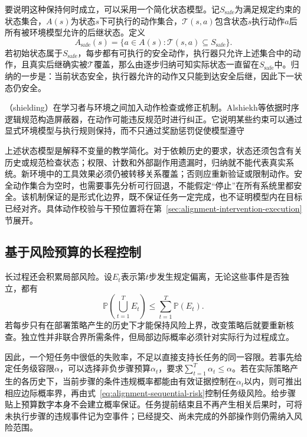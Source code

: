 要说明这种保持何时成立，可以采用一个简化状态模型。记$S_{\mathrm{safe}}$为满足规定约束的状态集合，$A(s)$为状态$s$下可执行的动作集合，$\mathcal T(s,a)$包含状态$s$执行动作$a$后所有被环境模型允许的后继状态。定义
\begin{equation}
 A_{\mathrm{safe}}(s)
 =\{a\in A(s):\mathcal T(s,a)\subseteq S_{\mathrm{safe}}\}.
 \label{eq:alignment-safe-actions}
\end{equation}
若初始状态属于$S_{\mathrm{safe}}$，每步都有可执行的安全动作，执行器只允许上述集合中的动作，且真实后继确实被$\mathcal T$覆盖，那么由逐步归纳可知实际状态一直留在$S_{\mathrm{safe}}$中。归纳的一步是：当前状态安全，执行器允许的动作又只能到达安全后继，因此下一状态仍安全。

（shielding）在学习者与环境之间加入动作检查或修正机制。Alshiekh等依据时序逻辑规范构造屏蔽器，在动作可能违反规范时进行纠正。它说明某些约束可以通过显式环境模型与执行规则保持，而不只通过奖励惩罚促使模型遵守

上述状态模型是解释不变量的教学简化。对于依赖历史的要求，状态还须包含有关历史或规范检查状态；权限、计数和外部副作用遗漏时，归纳就不能代表真实系统。新环境中的工具效果必须仍被转移关系覆盖；否则应重新验证或限制动作。安全动作集合为空时，也需要事先分析可行回退，不能假定“停止”在所有系统里都安全。该机制保证的是形式化边界，既不保证任务一定完成，也不证明模型内在目标已经对齐。具体动作校验与干预位置将在第~\ref{sec:alignment-intervention-execution}节展开。

\subsection{基于风险预算的长程控制}
\label{sec:alignment-generalization-horizon}

长过程还会积累局部风险。设$E_t$表示第$t$步发生规定偏离，无论这些事件是否独立，都有
\begin{equation}
 \mathbb P\left(\bigcup_{t=1}^{T}E_t\right)
 \leq\sum_{t=1}^{T}\mathbb P(E_t).
 \label{eq:alignment-sequential-risk}
\end{equation}
若每步只有在部署策略产生的历史下才能保持风险上界，改变策略后就要重新核查。独立性并非联合界所需条件，但局部边际概率必须针对实际行为过程成立。

因此，一个短任务中很低的失败率，不足以直接支持长任务的同一容限。若事先给定任务级容限$\alpha$，可以选择非负步骤预算$\alpha_t$，要求$\sum_{t=1}^{T}\alpha_t\leq\alpha$。若在实际策略产生的各历史下，当前步骤的条件违规概率都能由有效证据控制在$\alpha_t$以内，则可推出相应边际概率界，再由式~\eqref{eq:alignment-sequential-risk}控制任务级风险。给步骤贴上预算数字本身不会建立概率保证。任务提前结束且不再产生相关后果时，可将未执行步骤的违规事件记为空事件；已经提交、尚未完成的外部操作则仍需纳入风险范围。

